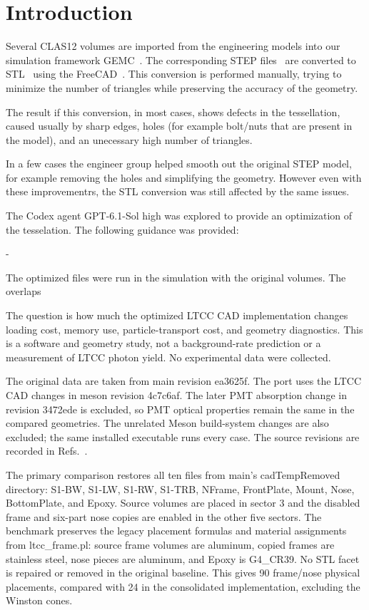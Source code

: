 \FloatBarrier

\section{Introduction}

Several CLAS12 volumes are imported from the engineering models into our simulation framework GEMC~\cite{gemc}.
The corresponding STEP files~\cite{step} are converted to STL~\cite{stl} using the FreeCAD~\cite{freecad}.
This conversion is performed manually, trying to minimize the number of triangles while preserving
the accuracy of the geometry.

The result if this conversion, in most cases, shows defects in the tessellation, caused usually by sharp
edges, holes (for example bolt/nuts that are present in the model), and an unecessary high number of triangles.

In a few cases the engineer group helped smooth out the original STEP model, for example removing the holes
and simplifying the geometry. However even with these improvementrs,
the STL conversion was still affected by the same issues.

The Codex agent GPT-6.1-Sol high was explored to provide an optimization of the tesselation.
The following guidance was provided:

-

The optimized files were run in the simulation with the original volumes.
The overlaps

The question is how much the optimized LTCC CAD implementation changes loading cost, memory use,
particle-transport cost, and geometry diagnostics. This is a software and geometry study, not a background-rate
prediction or a measurement of LTCC photon yield. No experimental data were collected.

The original data are taken from main revision ea3625f. The port uses the LTCC CAD changes in meson revision
4c7c6af. The later PMT absorption change in revision 3472ede is excluded, so PMT optical properties remain the
same in the compared geometries. The unrelated Meson build-system changes are also excluded; the same installed
executable runs every case. The source revisions are recorded in Refs.~\cite{baseline,optimized}.

The primary comparison restores all ten files from main's cadTempRemoved directory: S1-BW, S1-LW, S1-RW,
S1-TRB, NFrame, FrontPlate, Mount, Nose, BottomPlate, and Epoxy. Source volumes are placed in sector 3 and the
disabled frame and six-part nose copies are enabled in the other five sectors. The benchmark preserves the
legacy placement formulas and material assignments from ltcc\_frame.pl: source frame volumes are aluminum,
copied frames are stainless steel, nose pieces are aluminum, and Epoxy is G4\_CR39. No STL facet is repaired or
removed in the original baseline. This gives 90 frame/nose physical placements, compared with 24 in the
consolidated implementation, excluding the Winston cones.

